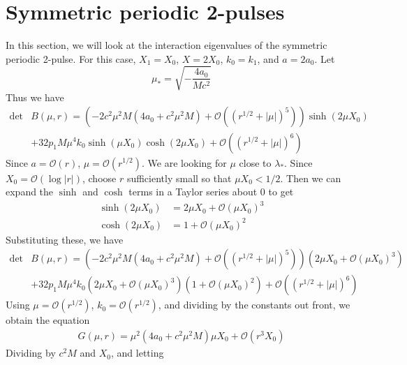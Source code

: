 \documentclass[thesis.tex]{subfiles}
\begin{document}
\section{Symmetric periodic 2-pulses}

In this section, we will look at the interaction eigenvalues of the symmetric periodic 2-pulse. For this case, $X_1 = X_0$, $X = 2 X_0$, $k_0 = k_1$, and $a = 2 a_0$. Let
\[
\mu_* = \sqrt{-\frac{4a_0}{M c^2}}
\]
Thus we have
\begin{equation}\label{Bsymmetric1}
\begin{aligned}
\det &B(\mu, r) = \left(-2 c^2 \mu^2 M (4a_0 + c^2 \mu^2 M) +  \mathcal{O}( (r^{1/2} + |\mu|)^5 )\right) \sinh(2 \mu X_0) \\
&+32 p_1 M \mu^4 k_0\sinh(\mu X_0) \cosh(2 \mu X_0) + \mathcal{O}( (r^{1/2} + |\mu|)^6) 
\end{aligned}
\end{equation}
Since $a = \mathcal{O}(r)$, $\mu = \mathcal{O}(r^{1/2})$. We are looking for $\mu$ close to $\lambda_*$. Since $X_0 = \mathcal{O}(\log|r|)$, choose $r$ sufficiently small so that $\mu X_0 < 1/2$. Then we can expand the $\sinh$ and $\cosh$ terms in a Taylor series about 0 to get
\begin{align*}
\sinh(2\mu X_0) &= 2 \mu X_0 + \mathcal{O}\left(\mu X_0 \right)^3 \\
\cosh(2\mu X_0) &= 1 + \mathcal{O}\left(\mu X_0 \right)^2
\end{align*}
Substituting these, we have
\begin{equation}\label{Bsymmetric2}
\begin{aligned}
\det &B(\mu, r) = \left(-2 c^2 \mu^2 M (4a_0 + c^2 \mu^2 M) +  \mathcal{O}( (r^{1/2} + |\mu|)^5 )\right) \left( 2 \mu X_0 + \mathcal{O}\left(\mu X_0 \right)^3 \right) \\
&+32 p_1 M \mu^4 k_0 \left( 2 \mu X_0 + \mathcal{O}\left(\mu X_0 \right)^3 \right) \left( 1 + \mathcal{O}\left(\mu X_0 \right)^2 \right) + \mathcal{O}( (r^{1/2} + |\mu|)^6) 
\end{aligned}
\end{equation}
Using $\mu = \mathcal{O}(r^{1/2})$, $k_0 = \mathcal{O}(r^{1/2})$, and dividing by the constants out front, we obtain the equation
\begin{equation*}
\begin{aligned}
G(\mu, r) = \mu^2 (4a_0 + c^2 \mu^2 M) \mu X_0 + \mathcal{O}( r^3 X_0 ) 
\end{aligned}
\end{equation*}
Dividing by $c^2 M$ and $X_0$, and letting
\end{document}

